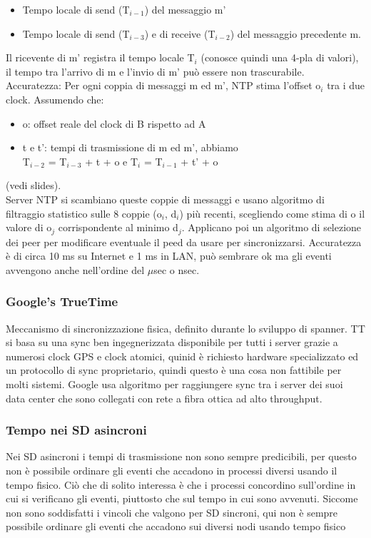 \documentclass[16px]{article}
\begin{document}
\begin{itemize}
\item Tempo locale di send (T$_{i-1}$) del messaggio m'
\item Tempo locale di send (T$_{i-3}$) e di receive (T$_{i-2}$) del messaggio precedente m.
\end{itemize}
Il ricevente di m' registra il tempo locale T$_i$ (conosce quindi una 4-pla di valori), il tempo tra l'arrivo di m e l'invio di m' può essere non trascurabile.\\ Accuratezza: Per ogni coppia di messaggi m ed m', NTP stima l'offset o$_i$ tra i due clock. Assumendo che:
\begin{itemize}
\item o: offset reale del clock di B rispetto ad A
\item t e t': tempi di trasmissione di m ed m', abbiamo\\
T$_{i-2}$ =  T$_{i-3}$ + t + o e T$_i$ = T$_{i-1}$ + t' + o
\end{itemize}
(vedi slides). \\ Server NTP si scambiano queste coppie di messaggi e usano algoritmo di filtraggio statistico sulle 8 coppie (o$_i$, d$_i$) più recenti, scegliendo come stima di o il valore di o$_j$ corrispondente al minimo d$_j$. Applicano poi un algoritmo di selezione dei peer per modificare eventuale il peed da usare per sincronizzarsi. Accuratezza è di circa 10 ms su Internet e 1 ms in LAN, può sembrare ok ma gli eventi avvengono anche nell'ordine del $\mu$sec o nsec.
\subsubsection{Google's TrueTime}
Meccanismo di sincronizzazione fisica, definito durante lo sviluppo di spanner. TT si basa su una sync ben ingegnerizzata disponibile per tutti i server grazie a numerosi clock GPS e clock atomici, quinid è richiesto hardware specializzato ed un protocollo di sync proprietario, quindi questo è una cosa non fattibile per molti sistemi. Google usa algoritmo per raggiungere sync tra i server dei suoi data center che sono collegati con rete a fibra ottica ad alto throughput.
\subsubsection{Tempo nei SD asincroni}
Nei SD asincroni i tempi di trasmissione non sono sempre predicibili, per questo non è possibile ordinare gli eventi che accadono in processi diversi usando il tempo fisico. Ciò che di solito interessa è che i processi concordino sull'ordine in cui si verificano gli eventi, piuttosto che sul tempo in cui sono avvenuti. Siccome non sono soddisfatti i vincoli che valgono per SD sincroni, qui non è sempre possibile ordinare gli eventi che accadono sui diversi nodi usando tempo fisico
\end{document}

